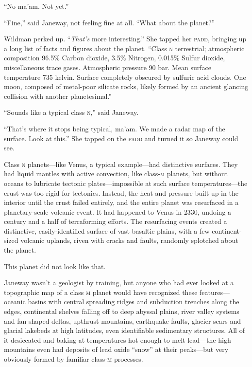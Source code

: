 \documentclass[twoside,letterpaper,12pt]{memoir}
\begin{document}
``No ma'am. Not yet.''

``Fine,'' said Janeway, not feeling fine at all. ``What about the planet?''

Wildman perked up. ``\textit{That's} more interesting.'' She tapped her \textsc{padd}, bringing up a long list of facts and figures about the planet. ``Class \textsc{n} terrestrial; atmospheric composition 96.5\% Carbon dioxide, 3.5\% Nitrogen, 0.015\% Sulfur dioxide, miscellaneous trace gases. Atmospheric pressure 90 bar. Mean surface temperature 735 kelvin. Surface completely obscured by sulfuric acid clouds. One moon, composed of metal-poor silicate rocks, likely formed by an ancient glancing collision with another planetesimal.''

``Sounds like a typical class \textsc{n},'' said Janeway.

``That's where it stops being typical, ma'am. We made a radar map of the surface. Look at this.'' She tapped on the \textsc{padd} and turned it so Janeway could see.

Class \textsc{n} planets---like Venus, a typical example---had distinctive surfaces. They had liquid mantles with active convection, like class-\textsc{m} planets, but without oceans to lubricate tectonic plates---impossible at such surface temperatures---the crust was too rigid for tectonics. Instead, the heat and pressure built up in the interior until the crust failed entirely, and the entire planet was resurfaced in a planetary-scale volcanic event. It had happened to Venus in 2330, undoing a century and a half of terraforming efforts. The resurfacing events created a distinctive, easily-identified surface of vast basaltic plains, with a few continent-sized volcanic uplands, riven with cracks and faults, randomly splotched about the planet.

This planet did not look like that.

Janeway wasn't a geologist by training, but anyone who had ever looked at a topographic map of a class \textsc{m} planet would have recognized these features---oceanic basins with central spreading ridges and subduction trenches along the edges, continental shelves falling off to deep abyssal plains, river valley systems and fan-shaped deltas, upthrust mountains, earthquake faults, glacier scars and glacial lakebeds at high latitudes, even identifiable sedimentary structures. All of it desiccated and baking at temperatures hot enough to melt lead---the high mountains even had deposits of lead oxide ``snow'' at their peaks---but very obviously formed by familiar class-\textsc{m} processes.
\end{document}
